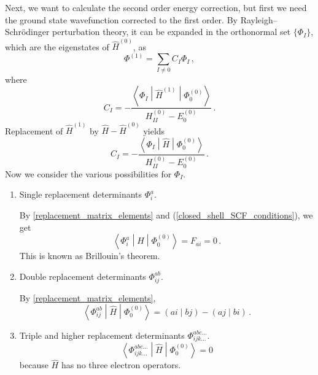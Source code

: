 \documentclass{article}
\theoremstyle{plain}\theoremheaderfont{\normalfont\itshape}\theorembodyfont{\rmfamily}\theoremseparator{.}\newtheorem*{rem}{Remark}\newtheorem*{ex}{Example}\newtheorem*{proof}{Proof}\newtheorem*{altp}{Alternative proof}
\theoremstyle{plain}\theoremheaderfont{\normalfont\bfseries}\theorembodyfont{\rmfamily}\theoremseparator{.}\newtheorem{thm}{Theorem}[section]\newtheorem{lem}[thm]{Lemma}\newtheorem{prop}[thm]{Proposition}\newtheorem*{cor}{Corollary}\newtheorem{defn}[thm]{Definition}\newtheorem{clm}[thm]{Claim}\newtheorem{clminproof}{Claim}
\theoremstyle{break}\theoremheaderfont{\normalfont\itshape}\theorembodyfont{\rmfamily}\theoremseparator{.\medskip}\newtheorem*{proofskip}{Proof}\newtheorem*{exs}{Examples}\newtheorem*{rems}{Remarks}
\theoremstyle{break}\theoremheaderfont{\normalfont\bfseries}\theorembodyfont{\rmfamily}\theoremseparator{.\medskip}\newtheorem{lemskip}[thm]{Lemma}\newtheorem{defnskip}[thm]{Definition}\newtheorem{propskip}[thm]{Proposition}\newtheorem{thmskip}[thm]{Theorem}
\numberwithin{equation}{section}
\newcommand{\mel}[3]{\left\langle #1 \middle| #2 \middle| #3 \right\rangle}
\newcommand{\bracket}[2]{\left( #1 \middle| #2 \right)}
\begin{document}
    Next, we want to calculate the second order energy correction, but first we need the ground state wavefunction corrected to the first order. By Rayleigh--Schr\"{o}dinger perturbation theory, it can be expanded in the orthonormal set \(\{\Phi_I\}\), which are the eigenstates of \(\hat{H}^{(0)}\), as
    \begin{equation}
        \Phi^{(1)}=\sum_{I\ne 0}C_I\Phi_I\,,
    \end{equation}
    where
    \begin{equation}
        C_I=-\frac{\mel{\Phi_I}{\hat{H}^{(1)}}{\Phi_0^{(0)}}}{H_{II}^{(0)}-E_0^{(0)}}\,.
    \end{equation}
    Replacement of \(\hat{H}^{(1)}\) by \(\hat{H}-\hat{H}^{(0)}\) yields
    \begin{equation}\label{MP2_wavefunction_coefficients}
        C_I=-\frac{\mel{\Phi_I}{\hat{H}}{\Phi_0^{(0)}}}{H_{II}^{(0)}-E_0^{(0)}}\,.
    \end{equation}
    Now we consider the various possibilities for \(\Phi_I\).
    \begin{enumerate}[topsep=0pt,label=(\roman*)]
        \item Single replacement determinants \(\Phi_{i}^{a}\).
        
        By \cref{replacement_matrix_elements} and (\ref{closed_shell_SCF_conditions}), we get
        \begin{equation}
            \mel{\Phi_{i}^{a}}{\hat{H}}{\Phi_0^{(0)}}=F_{ai}=0\,.
        \end{equation}
        This is known as Brillouin's theorem.
        \item Double replacement determinants \(\Phi_{ij}^{ab}\).
        
        By \cref{replacement_matrix_elements},
        \begin{equation}
            \mel{\Phi_{ij}^{ab}}{\hat{H}}{\Phi_0^{(0)}}=\bracket{ai}{bj}-\bracket{aj}{bi}\,.
        \end{equation}
        \item Triple and higher replacement determinants \(\Phi_{ijk\dots}^{abc\dots}\).
        \begin{equation}
            \mel{\Phi_{ijk\dots}^{abc\dots}}{\hat{H}}{\Phi_0^{(0)}}=0
        \end{equation}
        because \(\hat{H}\) has no three electron operators.
    \end{enumerate}
    
\end{document}

